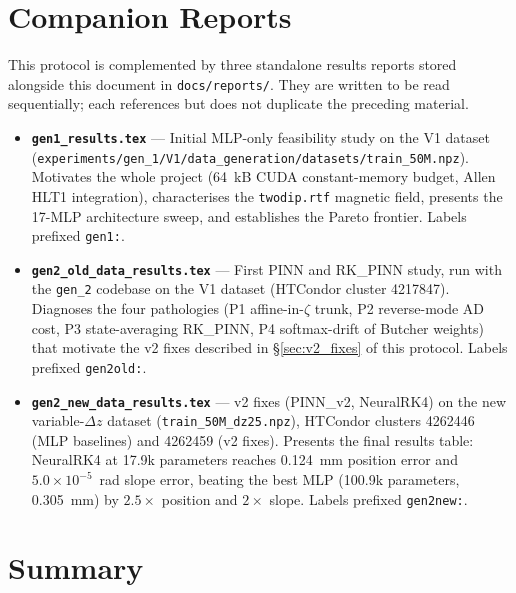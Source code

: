 \documentclass[a4paper,11pt]{article}
\newcommand{\SI}[2]{#1~#2}
\newcommand{\mm}{mm}
\newcommand{\dz}{\Delta z}
\begin{document}
\section{Companion Reports}
\label{sec:companion_reports}

This protocol is complemented by three standalone results reports stored
alongside this document in \texttt{docs/reports/}.  They are written to be
read sequentially; each references but does not duplicate the preceding
material.

\begin{itemize}
  \item \textbf{\texttt{gen1\_results.tex}} --- Initial MLP-only
    feasibility study on the V1 dataset
    (\texttt{experiments/gen\_1/V1/data\_generation/datasets/train\_50M.npz}).
    Motivates the whole project (64~kB CUDA constant-memory budget,
    Allen HLT1 integration), characterises the \texttt{twodip.rtf}
    magnetic field, presents the 17-MLP architecture sweep, and
    establishes the Pareto frontier.  Labels prefixed \texttt{gen1:}.
  \item \textbf{\texttt{gen2\_old\_data\_results.tex}} --- First PINN
    and RK\_PINN study, run with the \texttt{gen\_2} codebase on the
    V1 dataset (HTCondor cluster 4217847).  Diagnoses the four
    pathologies (P1 affine-in-$\zeta$ trunk, P2 reverse-mode AD cost,
    P3 state-averaging RK\_PINN, P4 softmax-drift of Butcher weights)
    that motivate the v2 fixes described in \S\ref{sec:v2_fixes} of
    this protocol.  Labels prefixed \texttt{gen2old:}.
  \item \textbf{\texttt{gen2\_new\_data\_results.tex}} --- v2 fixes
    (PINN\_v2, NeuralRK4) on the new variable-$\dz$ dataset
    (\texttt{train\_50M\_dz25.npz}), HTCondor clusters 4262446 (MLP
    baselines) and 4262459 (v2 fixes).  Presents the final results
    table: NeuralRK4 at 17.9k parameters reaches \SI{0.124}{\mm} position
    error and $5.0\times10^{-5}$~rad slope error, beating the best MLP
    (100.9k parameters, \SI{0.305}{\mm}) by $2.5\times$ position and
    $2\times$ slope.  Labels prefixed \texttt{gen2new:}.
\end{itemize}

\section{Summary}
\label{sec:summary}
\end{document}
